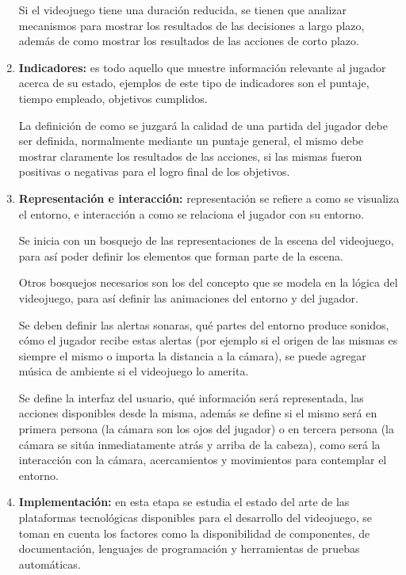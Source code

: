 \begin{enumerate}
Si el videojuego tiene una duración reducida, se tienen que analizar mecanismos para
mostrar los resultados de las decisiones a largo plazo, además de como mostrar
los resultados de las acciones de corto plazo.

\item \textbf{Indicadores:} es todo aquello que muestre información relevante al
    jugador acerca de su estado, ejemplos de este tipo de indicadores son el
    puntaje, tiempo empleado, objetivos cumplidos. 

La definición de como se juzgará la calidad de una partida del jugador debe ser
definida, normalmente mediante un puntaje general, el mismo debe mostrar
claramente los resultados de las acciones, si las mismas fueron positivas o
negativas para el logro final de los objetivos.

\item \textbf{Representación e interacción:} representación se refiere a como se
    visualiza el entorno, e interacción a como se relaciona el jugador con su
    entorno.

Se inicia con un bosquejo de las representaciones de la escena del videojuego, para
así poder definir los elementos que forman parte de la escena.

Otros bosquejos necesarios son los del concepto que se modela en la lógica del
videojuego, para así definir las animaciones del entorno y del jugador.

Se deben definir las alertas sonaras, qué partes del entorno produce sonidos,
cómo el jugador recibe estas alertas (por ejemplo si el origen de las mismas es
siempre el mismo o importa la distancia a la cámara), se puede agregar música de
ambiente si el videojuego lo amerita.

Se define la interfaz del usuario, qué información será representada, las
acciones disponibles desde la misma, además se define si el mismo será en
primera persona (la cámara son los ojos del jugador) o en tercera persona (la
cámara se sitúa inmediatamente atrás y arriba de la cabeza), como será la
interacción con la cámara, acercamientos y movimientos para contemplar el
entorno.

\item \textbf{Implementación:} en esta etapa se estudia el estado del arte de las
    plataformas tecnológicas disponibles para el desarrollo del videojuego, se toman
    en cuenta los factores como la disponibilidad de componentes, de
    documentación, lenguajes de programación y herramientas de pruebas
    automáticas.


\end{enumerate}
